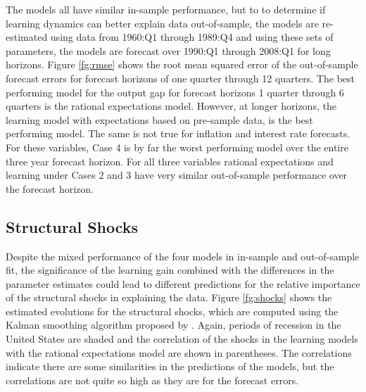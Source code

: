 The models all have similar in-sample performance, but to to determine if learning dynamics can better explain data out-of-sample, the models are re-estimated using data from 1960:Q1 through 1989:Q4 and using these sets of parameters, the models are forecast over 1990:Q1 through 2008:Q1 for long horizons.  Figure \ref{fg:rmse} shows the root mean squared error of the out-of-sample forecast errors for forecast horizons of one quarter through 12 quarters.  The best performing model for the output gap for forecast horizons 1 quarter through 6 quarters is the rational expectations model.  However, at longer horizons, the learning model with expectations based on pre-sample data, is the best performing model.  The same is not true for inflation and interest rate forecasts.  For these variables, Case 4 is by far the worst performing model over the entire three year forecast horizon.  For all three variables rational expectations and learning under Cases 2 and 3 have very similar out-of-sample performance over the forecast horizon.

\subsection{Structural Shocks}

Despite the mixed performance of the four models in in-sample and out-of-sample fit, the significance of the learning gain combined with the differences in the parameter estimates could lead to different predictions for the relative importance of the structural shocks in explaining the data.  Figure \ref{fg:shocks} shows the estimated evolutions for the structural shocks, which are computed using the Kalman smoothing algorithm proposed by .  Again, periods of recession in the United States are shaded and the correlation of the shocks in the learning models with the rational expectations model are shown in parentheses.  The correlations indicate there are some similarities in the predictions of the models, but the correlations are not quite so high as they are for the forecast errors.  

